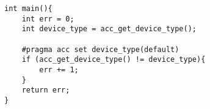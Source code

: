 \begin{Code}
\begin{lstlisting}[frame=single, caption=Parallel Construct Loop, label=prototype, numbers=none]
int main(){
    int err = 0;
    int device_type = acc_get_device_type();

    #pragma acc set device_type(default)
    if (acc_get_device_type() != device_type){
        err += 1;
    }
    return err;
}
\end{lstlisting}
\end{Code}